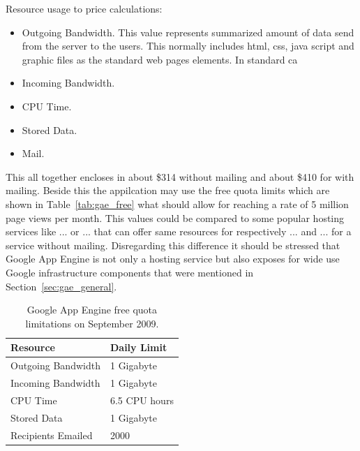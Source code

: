 Resource usage to price calculations:
\begin{itemize}
\item{Outgoing Bandwidth. This value represents summarized amount of data send from the server to the users. This normally includes html, css, java script and graphic files as the standard web pages elements. In standard ca  }
\item{Incoming Bandwidth. }
\item{CPU Time. }
\item{Stored Data. }
\item{Mail. }
\end{itemize} 
This all together encloses in about \$314 without mailing and about \$410 for with mailing. Beside this the appilcation may use the free quota limits which are shown in Table~\ref{tab:gae_free} what should allow for reaching a rate of 5 million page views per month. This values could be compared to some popular hosting services like ... or ... that can offer same resources for respectively ... and ... for a service without mailing. Disregarding this difference it should be stressed that Google App Engine is not only a hosting service but also exposes for wide use Google infrastructure components that were mentioned in Section~\ref{sec:gae_general}.   
\begin{table}[h]
\centering
\caption{Google App Engine free quota limitations on September 2009.}
\label{tab:gae_cost}
\begin{tabular}{|l|l|} \hline \hline
\textbf{Resource} & \textbf{Daily Limit} \\ \hline \hline
Outgoing Bandwidth & 1 Gigabyte \\ \hline
Incoming Bandwidth & 1 Gigabyte \\ \hline
CPU Time & 6.5 CPU hours \\ \hline
Stored Data & 1 Gigabyte \\ \hline
Recipients Emailed & 2000 \\ \hline \hline
\end{tabular}
\end{table}



